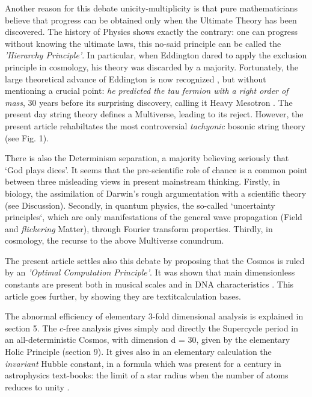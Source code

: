 \documentclass[twoside,draft]{article}
\begin{document}
\begin{sloppypar}
Another reason for this debate unicity-multiplicity is that pure mathematicians believe that progress can be obtained only when the Ultimate Theory has been discovered. The history of Physics shows exactly the contrary: one can progress without knowing the ultimate laws, this no-said principle can be called the \textit{'Hierarchy Principle'}. In particular, when Eddington\cite{Eddington} dared to apply the exclusion principle in cosmology, his theory was discarded by a majority. Fortunately, the large theoretical advance of Eddington is now recognized \cite{Durham}, but without mentioning a crucial point: \textit{he predicted the tau fermion with a right order of mass}, 30 years before its surprising discovery, calling it Heavy Mesotron \cite{Eddington}. The present day string theory defines a Multiverse, leading to its reject\cite{Woigt}. However, the present article rehabiltates the most controversial \textit{tachyonic} bosonic string theory (see Fig. 1).

There is also the Determinism separation, a majority believing seriously that `God plays dices'. It seems that the pre-scientific role of chance is a common point between three misleading views in present mainstream thinking. Firstly, in biology, the assimilation of Darwin's rough argumentation with a scientific theory (see Discussion). Secondly, in quantum physics, the so-called `uncertainty principles`, which are only manifestations of the general wave propagation (Field and \textit{flickering} Matter), through Fourier transform properties. Thirdly, in cosmology, the recurse to the above Multiverse conundrum.

The present article settles also this debate by proposing that the Cosmos is ruled by an \textit{'Optimal Computation Principle'}. It was shown that main dimensionless constants are present both in musical scales and in DNA characteristics \cite{Sanchez1}. This article goes further, by showing they are textit{calculation bases}.

The abnormal efficiency of elementary 3-fold dimensional analysis is explained in section 5. The $c$-free analysis gives simply and directly the Supercycle period in an all-deterministic Cosmos, with dimension d = 30, given by the elementary Holic Principle (section 9). It gives also in an elementary calculation the \textit{invariant} Hubble constant, in a formula which was present for a century in astrophysics text-books: the limit of a star radius when the number of atoms reduces to unity \cite{Sanchez1}.



\end{sloppypar}
\end{document}
